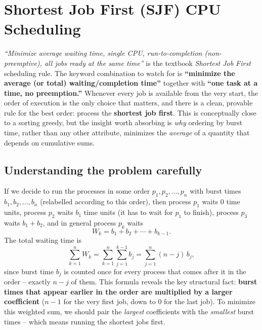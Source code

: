 \section{Shortest Job First (SJF) CPU Scheduling}
\label{sec:shortest-job-first}


\begin{patternbox}
\emph{``Minimize average waiting time, single CPU, run-to-completion
(non-preemptive), all jobs ready at the same time''} is the textbook
\emph{Shortest Job First} scheduling rule. The keyword combination to watch
for is \textbf{``minimize the average (or total) waiting/completion
time''} together with \textbf{``one task at a time, no preemption.''}
Whenever every job is available from the very start, the order of execution
is the only choice that matters, and there is a clean, provable rule for the
best order: process the \textbf{shortest job first}. This is conceptually
close to a sorting greedy, but the insight worth absorbing is \emph{why}
ordering by burst time, rather than any other attribute, minimizes the
\emph{average} of a quantity that depends on cumulative sums.
\end{patternbox}

\subsection*{Understanding the problem carefully}

If we decide to run the processes in some order $p_1, p_2, \dots, p_n$ with
burst times $b_1, b_2, \dots, b_n$ (relabelled according to this order),
then process $p_1$ waits $0$ time units, process $p_2$ waits $b_1$ time
units (it has to wait for $p_1$ to finish), process $p_3$ waits
$b_1 + b_2$, and in general process $p_k$ waits
\[
  W_k = b_1 + b_2 + \cdots + b_{k-1}.
\]
The total waiting time is
\[
  \sum_{k=1}^{n} W_k = \sum_{k=1}^{n} \sum_{j=1}^{k-1} b_j
                      = \sum_{j=1}^{n} (n - j)\, b_j,
\]
since burst time $b_j$ is counted once for every process that comes after
it in the order -- exactly $n-j$ of them. This formula reveals the key
structural fact: \textbf{burst times that appear earlier in the order are
multiplied by a larger coefficient} ($n-1$ for the very first job, down to
$0$ for the last job). To minimize this weighted sum, we should pair the
\emph{largest} coefficients with the \emph{smallest} burst times -- which
means running the shortest jobs first.

